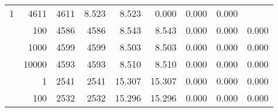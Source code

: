 \begin{table}
\begin{tabular}{rrrrrrrrr}
					\multirow{ 1 }{*}{ 1 } &
					
						
							    
							     4611  & 4611  
	                           & 8.523 & 8.523 & 0.000
	                           & 0.000 & 0.000  \\
	                
	            
					 &  
					 
					\multirow{ 1 }{*}{ 100 } &
					
						
							    
							     4586  & 4586  
	                           & 8.543 & 8.543 & 0.000
	                           & 0.000 & 0.000  \\
	                
	            
					 &  
					 
					\multirow{ 1 }{*}{ 1000 } &
					
						
							    
							     4599  & 4599  
	                           & 8.503 & 8.503 & 0.000
	                           & 0.000 & 0.000  \\
	                
	            
					 &  
					 
					\multirow{ 1 }{*}{ 10000 } &
					
						
							    
							     4593  & 4593  
	                           & 8.510 & 8.510 & 0.000
	                           & 0.000 & 0.000  \\
	                
	            
	        
				\noalign{\smallskip}\hline
				\multirow{ 4 }{*}{ 2000000 } &
				
					
					 
					\multirow{ 1 }{*}{ 1 } &
					
						
							    
							     2541  & 2541  
	                           & 15.307 & 15.307 & 0.000
	                           & 0.000 & 0.000  \\
	                
	            
					 &  
					 
					\multirow{ 1 }{*}{ 100 } &
					
						
							    
							     2532  & 2532  
	                           & 15.296 & 15.296 & 0.000
	                           & 0.000 & 0.000  \\
	                

\end{tabular}
\end{table}
